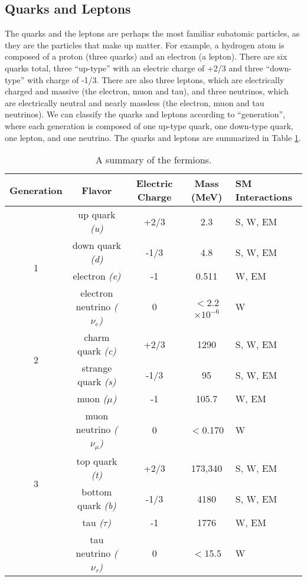 \subsection{Quarks and Leptons}
The quarks and the leptons are perhaps the most familiar subatomic particles, as they are the particles that make up matter.  For example, a hydrogen atom is composed of a proton (three quarks) and an electron (a lepton).  There are six quarks total, three ``up-type'' with an electric charge of +2/3 and three ``down-type'' with charge of -1/3.  There are also three leptons, which are electrically charged and massive (the electron, muon and tau), and three neutrinos, which are electrically neutral and nearly massless (the electron, muon and tau neutrinos).  We can classify the quarks and leptons according to ``generation'', where each generation is composed of one up-type quark, one down-type quark, one lepton, and one neutrino.  The quarks and leptons are summarized in Table \ref{tab:QLTable}.

\begin{table}
	\caption{A summary of the fermions. 	\label{tab:QLTable}}
	\begin{tabular}{| c || c | c | c | p{2cm} |}
		\hline
		Generation &  Flavor & Electric Charge & Mass (MeV) & SM Interactions\\
		\hline
		\multirow{4}{*}{1} & up quark \it{(u)} & +2/3 & 2.3 & S, W, EM\\
		    & down quark \it{(d)} & -1/3 & 4.8 & S, W, EM\\
		    & electron \it{(e)}& -1 & 0.511 & W, EM \\
		    & electron neutrino \it{($\nu_{e}$)} & 0 & $<$2.2$\times 10^{-6}$ & W\\
		\hline
		\multirow{2}{*}{2} & charm quark \it{(c)} & +2/3 & 1290 &  S, W, EM \\
		    & strange quark \it{(s)} & -1/3 & 95 & S, W, EM \\
		    & muon \it{($\mu$)} & -1& 105.7 & W, EM \\
		    & muon neutrino \it{($\nu_{\mu}$)} & 0 & $<$0.170 & W \\
		\hline 
		\multirow{2}{*}{3} & top quark \it{(t)} & +2/3 & 173,340 & S, W, EM \\
		    & bottom quark \it{(b)} & -1/3  & 4180 & S, W, EM \\ 
		    & tau \it{($\tau$)} & -1 & 1776 & W, EM\\
		    & tau neutrino \it{($\nu_{\tau}$)} & 0 & $<$15.5 & W\\		    
		\hline
	\end{tabular}
\end{table}


